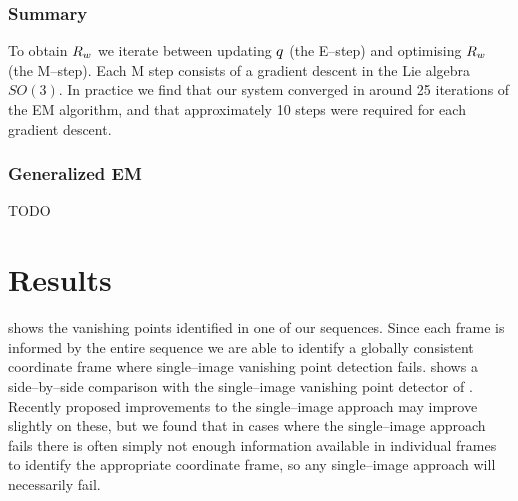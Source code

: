 \subsubsection{Summary}
To obtain $\SceneR$ we iterate between updating $\PosteriorEst$ (the
E--step) and optimising $\SceneR$ (the M--step). Each M step consists
of a gradient descent in the Lie algebra $SO(3)$. In practice we find
that our system converged in around 25 iterations of the EM algorithm,
and that approximately 10 steps were required for each gradient
descent.

\subsubsection{Generalized EM}

TODO

\section{Results}

 shows the vanishing points identified in one of
our sequences. Since each frame is informed by the entire sequence we
are able to identify a globally consistent coordinate frame where
single--image vanishing point detection fails. 
shows a side--by--side comparison with the single--image vanishing
point detector of \cite{Zhang02}. Recently proposed improvements to
the single--image approach \cite{Tardif09} may improve slightly on
these, but we found that in cases where the single--image approach
fails there is often simply not enough information available in
individual frames to identify the appropriate coordinate frame, so any
single--image approach will necessarily fail.


